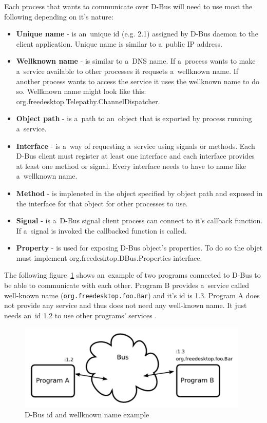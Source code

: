 Each process that wants to communicate over D-Bus will need to use most the following depending on it's nature: 
\begin{itemize}
	\item {\bf Unique name} - is an~unique id (e.g. 2.1) assigned by D-Bus daemon to the client application. Unique name is similar to a~public IP address.
	\item {\bf Wellknown name} - is similar to a~DNS name. If a~process wants to make a~service available to other processes it requsets a~wellknown name. If another process wants to access the service it uses the wellknown name to do so. Wellknown name might look like this: org.freedesktop.Telepathy.ChannelDispatcher.    
	\item {\bf Object path} - is a~path to an~object that is exported by process running a~service.
	\item {\bf Interface} - is a~way of requesting a~service using signals or methods. Each D-Bus client must register at least one interface and each interface provides at least one method or signal. Every interface needs to have to name like a~wellknown name.  
	\item {\bf Method} - is impleneted in the object specified by object path and exposed in the interface for that object for other processes to use. 
	\item {\bf Signal} - is a~D-Bus signal client process can connect to it's callback function. If a~signal is invoked the callbacked function is called.
	\item {\bf Property} - is used for exposing D-Bus object's properties. To do so the objet must implement org.freedesktop.DBus.Properties interface.
\end{itemize}

The following figure~\ref{fig:dbusArchitectureNames} shows an~example of two programs connected to D-Bus to be able to communicate with each other. Program B provides a~service called well-known name (\verb|org.freedesktop.foo.Bar|) and it's id is 1.3. Program A does not provide any service and thus does not need any well-known name. It just needs an~id 1.2 to use other programs' services \cite{TPWiki}.

\begin{figure}[ht]
\begin{center}
	\includegraphics[width=11cm]{fig/dbus-architecture-names.png}
	\caption{D-Bus id and wellknown name example \cite{TPWiki}}
	\label{fig:dbusArchitectureNames}
\end{center}
\end{figure}


